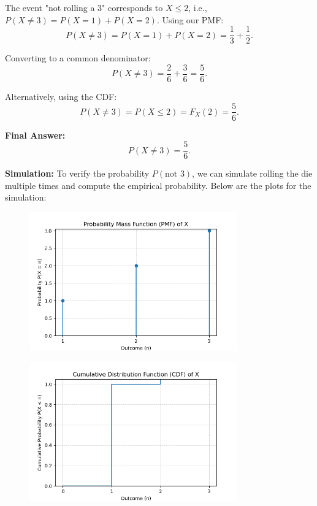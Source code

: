 \documentclass[journal]{IEEEtran}
\begin{document}
	The event "not rolling a 3" corresponds to \( X \leq 2 \), i.e., \( P(X \neq 3) = P(X = 1) + P(X = 2) \). Using our PMF:
	\[
	P(X \neq 3) = P(X = 1) + P(X = 2) = \frac{1}{3} + \frac{1}{2}.
	\]
	
	Converting to a common denominator:
	\[
	P(X \neq 3) = \frac{2}{6} + \frac{3}{6} = \frac{5}{6}.
	\]
	
	Alternatively, using the CDF:
	\[
	P(X \neq 3) = P(X \leq 2) = F_X(2) = \frac{5}{6}.
	\]
	
	\textbf{Final Answer:}
	\[P(X \neq 3) = \frac{5}{6}.\]
	
	
	\textbf{Simulation:}
	To verify the probability \( P(\text{not } 3) \), we can simulate rolling the die multiple times and compute the empirical probability. Below are the plots for the simulation:
	
	\begin{figure}[h]
	\centering
	\includegraphics[width=0.8\textwidth]{figs/pmf.png}
	\end{figure}
	
	\begin{figure}[h]
		\centering
		\includegraphics[width=0.8\textwidth]{figs/cdf.png}
	\end{figure}
	
\end{document}
